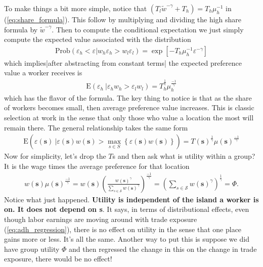 \documentclass[pdftex,12pt]{article}
\begin{document}
\medskip
\noindent To make things a bit more simple, notice that $\left(T_l\tilde w ^{-\gamma} + T_h \right) = T_h \mu_h^{-1}$ in (\ref{eq:share_formula}). This follow by multiplying and dividing the high share formula by $\tilde w^{-\gamma}$. Then to compute the conditional expectation we just simply compute the expected value associated with the distribution
\begin{align}
\mathrm{Prob}\left( \varepsilon_h < \varepsilon | w_h \varepsilon_h >  w_l\varepsilon_l\right) = \exp\left[-T_h\mu_h^{-1}\varepsilon^{-\gamma}\right]
\end{align}
which implies|after abstracting from constant terms| the expected preference value a worker receives is
\begin{align}
\mathrm{E}\left(\varepsilon_h\ |\varepsilon_h w_h > \varepsilon_l w_l\right) = T_h^{\frac{1}{\gamma}} \mu_h^{\frac{-1}{\gamma}}
\end{align}
which has the flavor of the \citet{arkolakis2012new} formula. The key thing to notice is that as the share of workers becomes small, then average preference value increases. This is classic selection at work in the sense that only those who value a location the most will remain there. The general relationship takes the same form
\begin{align}
\mathrm{E}\left(\varepsilon(\textbf{s}) \ |\varepsilon(\textbf{s}) w(\textbf{s}) > \max_{s \in S}\left\{\varepsilon(\textbf{s}) w(\textbf{s})\right\}\right) = T(\textbf{s})^{\frac{1}{\gamma}} \mu(\textbf{s})^{\frac{-1}{\gamma}}
\end{align}
Now for simplicity, let's drop the $T$s and then ask what is utility within a group? It is the wage times the average preference for that location
\begin{align}
w(\textbf{s}) \mu(\textbf{s})^{\frac{-1}{\gamma}} =  w(\textbf{s}) \left(\frac{w(\textbf{s})^{\gamma}}{\sum_{s \in \mathcal{S}} w(\textbf{s})^{\gamma}}\right)^{\frac{-1}{\gamma}}
 =  \left(\sum_{s \in \mathcal{S}} w(\textbf{s})^{\gamma}\right)^{\frac{1}{\gamma}} = \Phi.
\end{align}
Notice what just happened. \textbf{Utility is independent of the island a worker is on. It does not depend on \textbf{s}}. It says, in terms of distributional effects, even though labor earnings are moving around with trade exposure (\ref{eq:adh_regression}), there is no effect on utility in the sense that one place gains more or less. It's all the same. Another way to put this is suppose we did have group utility $\Phi$ and then regressed the change in this on the change in trade exposure, there would be no effect!
\end{document}
